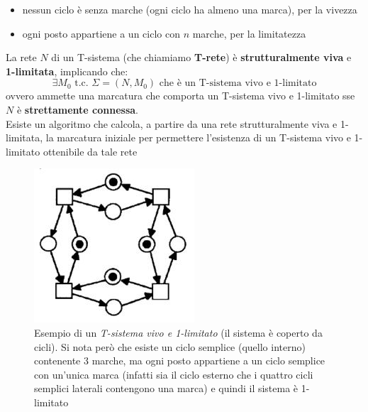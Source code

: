 \documentclass[a4paper,12pt, oneside]{book}
\begin{document}
\begin{itemize}
  \item nessun ciclo è senza marche (ogni ciclo ha almeno una marca), per la
  vivezza 
  \item ogni posto appartiene a un ciclo con $n$ marche, per la limitatezza
\end{itemize}
\begin{teorema}
  La rete $N$ di un T-sistema (che chiamiamo \textbf{T-rete}) è
  \textbf{strutturalmente viva} e \textbf{1-limitata}, implicando che:
  \[\exists M_0\mbox{ t.c. }\Sigma=(N,M_0) \mbox{ che è un T-sistema vivo e
      1-limitato}\]
  ovvero ammette una marcatura che comporta un T-sistema vivo e 1-limitato
  sse $N$ è \textbf{strettamente connessa}.\\
  Esiste un algoritmo che calcola, a partire da una rete strutturalmente viva e
  1-limitata, la marcatura iniziale per permettere l'esistenza di un T-sistema
  vivo e 1-limitato ottenibile da tale rete
\end{teorema}
\begin{figure}[H]
  \centering
  \includegraphics[scale = 0.6]{img/tsi6.jpg}
  \caption{Esempio di un \emph{T-sistema vivo e 1-limitato} (il sistema è
    coperto da cicli). Si nota però che esiste un ciclo semplice (quello
    interno) contenente 3 marche, ma ogni posto appartiene a un ciclo semplice
    con un’unica marca (infatti sia il ciclo esterno che i quattro cicli
    semplici laterali contengono una marca) e quindi il sistema è 1-limitato}  
\end{figure}
\newpage
\end{document}
